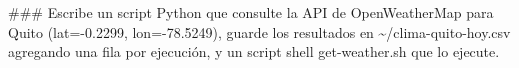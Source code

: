 \documentclass[11pt]{article}
\author{Anthonny Almeida}
\date{\today}
\title{}
\begin{document}
\tableofcontents

\#\#\# Escribe un script Python que consulte la API de OpenWeatherMap 
para Quito (lat=-0.2299, lon=-78.5249), guarde los resultados 
en \textasciitilde{}/clima-quito-hoy.csv agregando una fila por ejecución, y 
un script shell get-weather.sh que lo ejecute.
\end{document}
